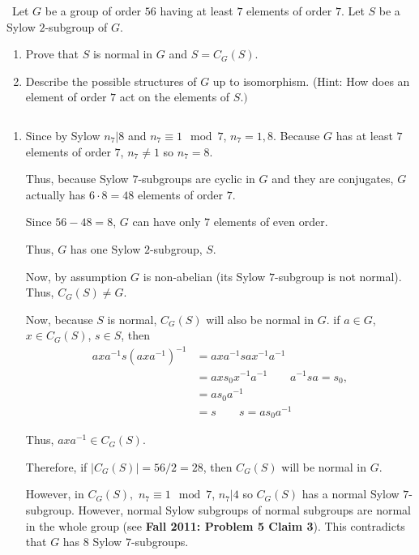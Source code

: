 \documentclass[12pt]{Qual}
\begin{document}
\begin{problem} $\,$
Let $G$ be a group of order $56$ having at least $7$ elements of order $7$. Let $S$ be a Sylow $2$-subgroup of $G.$
\begin{enumerate}[label=(\alph*)]
    \item Prove that $S$ is normal in $G$ and $S=C_G(S).$
    \item Describe the possible structures of $G$ up to isomorphism. (Hint: How does an element of order $7$ act on the elements of $S.)$
\end{enumerate}
\end{problem}


\begin{solution}$\,$
\begin{enumerate}[label=(\alph*)]
    \item Since by Sylow $n_7|8$ and $n_7\equiv 1\mod 7$, $n_7=1,8$. Because $G$ has at least $7$ elements of order $7$, $n_7\not=1$ so $n_7=8.$

    Thus, because Sylow $7$-subgroups are cyclic in $G$ and they are conjugates, $G$ actually has $6\cdot8=48$ elements of order $7.$

    Since $56-48=8$, $G$ can have only $7$ elements of even order.

    Thus, $G$ has one Sylow $2$-subgroup, $S.$

    Now, by assumption $G$ is non-abelian (its Sylow $7$-subgroup is not normal). Thus, $C_G(S)\not=G.$

    Now, because $S$ is normal, $C_G(S)$ will also be normal in $G.$ if $a\in G$, $x\in C_G(S)$, $s\in S$, then \begin{align*}
        axa^{-1}s(axa^{-1})^{-1}&=axa^{-1}sax^{-1}a^{-1}\\
        &=axs_0x^{-1}a^{-1}\qquad a^{-1}sa=s_0,\\
        &=as_0a^{-1}\\
        &=s\qquad s=as_0a^{-1}
    \end{align*}

    Thus, $axa^{-1}\in C_G(S).$

    Therefore, if $|C_G(S)|=56/2=28$, then $C_G(S)$ will be normal in $G$.

    However, in $C_G(S),$ $n_7\equiv 1\mod7$, $n_7|4$ so $C_G(S)$ has a normal Sylow $7$-subgroup. However, normal Sylow subgroups of normal subgroups are normal in the whole group (see \textbf{Fall 2011: Problem 5 Claim 3}). This contradicts that $G$ has $8$ Sylow $7$-subgroups.


\end{enumerate}
\end{solution}
\end{document}
